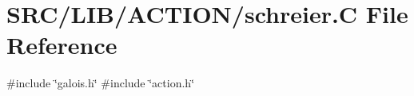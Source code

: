 \hypertarget{schreier_8_c}{}\section{S\+R\+C/\+L\+I\+B/\+A\+C\+T\+I\+O\+N/schreier.C File Reference}
\label{schreier_8_c}
{\ttfamily \#include \char`\"{}galois.\+h\char`\"{}}\newline
{\ttfamily \#include \char`\"{}action.\+h\char`\"{}}\newline
